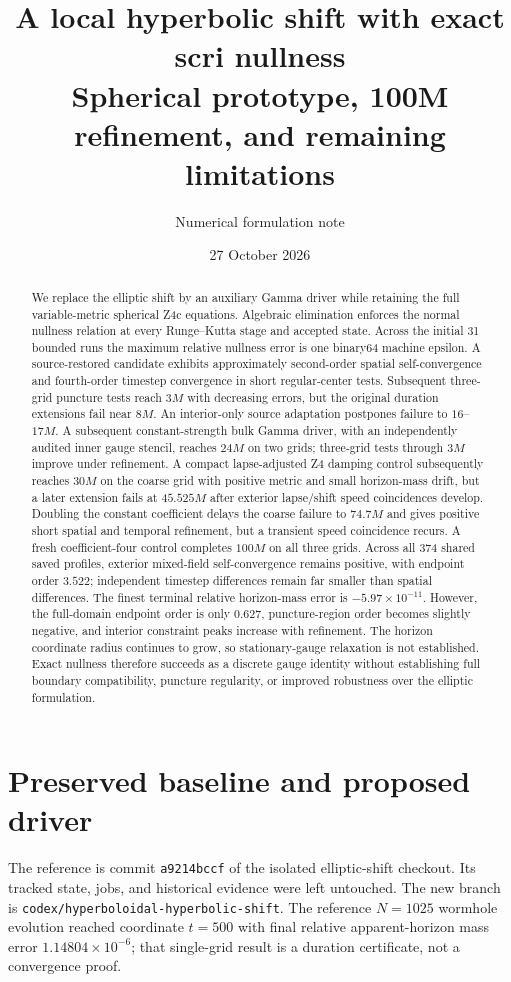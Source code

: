 \documentclass[11pt]{article}
\title{A local hyperbolic shift with exact scri nullness\\\large Spherical prototype, 100M refinement, and remaining limitations}
\author{Numerical formulation note}
\date{27 October 2026}
\begin{document}
\maketitle
\begin{abstract}
We replace the elliptic shift by an auxiliary Gamma driver while retaining the full variable-metric spherical Z4c equations. Algebraic elimination enforces the normal nullness relation at every Runge--Kutta stage and accepted state. Across the initial 31 bounded runs the maximum relative nullness error is one binary64 machine epsilon. A source-restored candidate exhibits approximately second-order spatial self-convergence and fourth-order timestep convergence in short regular-center tests. Subsequent three-grid puncture tests reach $3M$ with decreasing errors, but the original duration extensions fail near $8M$. An interior-only source adaptation postpones failure to $16$--$17M$. A subsequent constant-strength bulk Gamma driver, with an independently audited inner gauge stencil, reaches $24M$ on two grids; three-grid tests through $3M$ improve under refinement. A compact lapse-adjusted Z4 damping control subsequently reaches $30M$ on the coarse grid with positive metric and small horizon-mass drift, but a later extension fails at $45.525M$ after exterior lapse/shift speed coincidences develop. Doubling the constant coefficient delays the coarse failure to $74.7M$ and gives positive short spatial and temporal refinement, but a transient speed coincidence recurs. A fresh coefficient-four control completes $100M$ on all three grids. Across all 374 shared saved profiles, exterior mixed-field self-convergence remains positive, with endpoint order $3.522$; independent timestep differences remain far smaller than spatial differences. The finest terminal relative horizon-mass error is $-5.97\times10^{-11}$. However, the full-domain endpoint order is only $0.627$, puncture-region order becomes slightly negative, and interior constraint peaks increase with refinement. The horizon coordinate radius continues to grow, so stationary-gauge relaxation is not established. Exact nullness therefore succeeds as a discrete gauge identity without establishing full boundary compatibility, puncture regularity, or improved robustness over the elliptic formulation.
\end{abstract}

\section{Preserved baseline and proposed driver}
The reference is commit \texttt{a9214bccf} of the isolated elliptic-shift checkout. Its tracked state, jobs, and historical evidence were left untouched. The new branch is \texttt{codex/hyperboloidal-hyperbolic-shift}. The reference $N=1025$ wormhole evolution reached coordinate $t=500$ with final relative apparent-horizon mass error $1.14804\times10^{-6}$; that single-grid result is a duration certificate, not a convergence proof.
\end{document}
